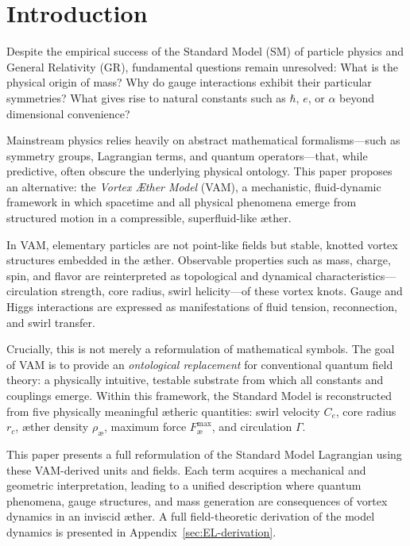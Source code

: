 \section{Introduction}\label{sec:inleiding}

Despite the empirical success of the Standard Model (SM) of particle physics and General Relativity (GR), fundamental questions remain unresolved: What is the physical origin of mass? Why do gauge interactions exhibit their particular symmetries? What gives rise to natural constants such as $\hbar$, $e$, or $\alpha$ beyond dimensional convenience?

Mainstream physics relies heavily on abstract mathematical formalisms—such as symmetry groups, Lagrangian terms, and quantum operators—that, while predictive, often obscure the underlying physical ontology. This paper proposes an alternative: the \emph{Vortex Æther Model} (VAM), a mechanistic, fluid-dynamic framework in which spacetime and all physical phenomena emerge from structured motion in a compressible, superfluid-like æther.

In VAM, elementary particles are not point-like fields but stable, knotted vortex structures embedded in the æther. Observable properties such as mass, charge, spin, and flavor are reinterpreted as topological and dynamical characteristics—circulation strength, core radius, swirl helicity—of these vortex knots. Gauge and Higgs interactions are expressed as manifestations of fluid tension, reconnection, and swirl transfer.

Crucially, this is not merely a reformulation of mathematical symbols. The goal of VAM is to provide an \emph{ontological replacement} for conventional quantum field theory: a physically intuitive, testable substrate from which all constants and couplings emerge. Within this framework, the Standard Model is reconstructed from five physically meaningful ætheric quantities: swirl velocity $C_e$, core radius $r_c$, æther density $\rho_\text{\ae}$, maximum force $F^{\text{max}}_{\text{\ae}}$, and circulation $\Gamma$.

This paper presents a full reformulation of the Standard Model Lagrangian using these VAM-derived units and fields. Each term acquires a mechanical and geometric interpretation, leading to a unified description where quantum phenomena, gauge structures, and mass generation are consequences of vortex dynamics in an inviscid æther. A full field-theoretic derivation of the model dynamics is presented in Appendix~\ref{sec:EL-derivation}.

